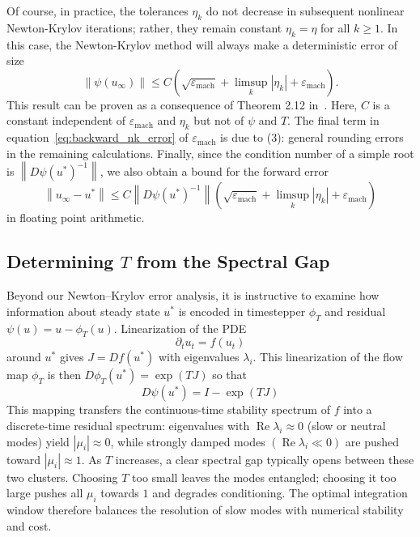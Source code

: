 \documentclass{article}
\newcommand{\norm}[1]{\left\lVert#1\right\rVert}
\begin{document}
Of course, in practice, the tolerances $\eta_k$ do not decrease in subsequent nonlinear Newton-Krylov iterations; rather, they remain constant $\eta_k = \eta$ for all $k \geq 1$. In this case, the Newton-Krylov method will always make a deterministic error of size
\begin{equation} \label{eq:backward_nk_error}
    \norm{\psi(u_\infty)} \leq C\left( \sqrt{\varepsilon_{\text{mach}}} + \limsup_{k} |\eta_k| + \varepsilon_{\text{mach}}\right).
\end{equation}
This result can be proven as a consequence of Theorem 2.12 in~\cite{}. Here, $C$ is a constant independent of $\varepsilon_{\text{mach}}$ and $\eta_k$ but not of $\psi$ and $T$. The final term in equation~\eqref{eq:backward_nk_error} of $\varepsilon_{\text{mach}}$ is due to (3): general rounding errors in the remaining calculations. Finally, since the condition number of a simple root is $\norm{D\psi(u^*)^{-1}}$, we also obtain a bound for the forward error
\begin{equation}
 \norm{u_\infty - u^*} \leq C \norm{D\psi(u^*)^{-1} }\left( \sqrt{\varepsilon_{\text{mach}}} + \limsup_{k} |\eta_k| + \varepsilon_{\text{mach}} \right)
\end{equation}
in floating point arithmetic.

\subsection{Determining $T$ from the Spectral Gap}
Beyond our Newton–Krylov error analysis, it is instructive to examine how information about steady state $u^*$ is encoded in timestepper $\phi_T$ and residual $\psi(u) = u-\phi_T(u)$. Linearization of the PDE
\begin{equation}
    \partial_t u_t = f(u_t)
\end{equation}
around $u^*$ gives $J = D f(u^*)$ with eigenvalues $\lambda_i$. This linearization of the flow map $\phi_T$ is then $D \phi_T(u^*) = \exp\left(T J\right)$ so that
\begin{equation}
    D \psi(u^*) = I - \exp\left(T J\right)
\end{equation}
This mapping transfers the continuous-time stability spectrum of $f$ into a discrete-time residual spectrum: eigenvalues with $\operatorname{Re}\lambda_i \approx 0$ (slow or neutral modes) yield $|\mu_i|\approx 0$, while strongly damped modes $(\operatorname{Re}\lambda_i \ll 0)$ are pushed toward $|\mu_i|\approx 1$.  As $T$ increases, a clear spectral gap typically opens between these two clusters.  Choosing $T$ too small leaves the modes entangled; choosing it too large pushes all $\mu_i$ towards $1$ and degrades conditioning. The optimal integration window therefore balances the resolution of slow modes with numerical stability and cost.
\end{document}
